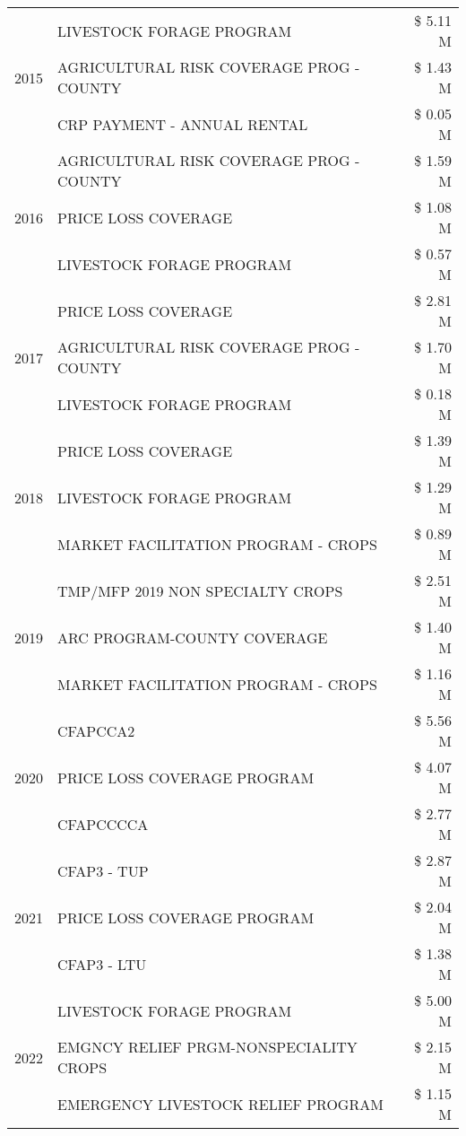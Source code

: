 \begin{tabular}{llr}
\multirow[t]{3}{*}{2015} & LIVESTOCK FORAGE PROGRAM & \$ 5.11 M \\
 & AGRICULTURAL RISK COVERAGE PROG - COUNTY & \$ 1.43 M \\
 & CRP PAYMENT - ANNUAL RENTAL & \$ 0.05 M \\
\cline{1-3}
\multirow[t]{3}{*}{2016} & AGRICULTURAL RISK COVERAGE PROG - COUNTY & \$ 1.59 M \\
 & PRICE LOSS COVERAGE & \$ 1.08 M \\
 & LIVESTOCK FORAGE PROGRAM & \$ 0.57 M \\
\cline{1-3}
\multirow[t]{3}{*}{2017} & PRICE LOSS COVERAGE & \$ 2.81 M \\
 & AGRICULTURAL RISK COVERAGE PROG - COUNTY & \$ 1.70 M \\
 & LIVESTOCK FORAGE PROGRAM & \$ 0.18 M \\
\cline{1-3}
\multirow[t]{3}{*}{2018} & PRICE LOSS COVERAGE & \$ 1.39 M \\
 & LIVESTOCK FORAGE PROGRAM & \$ 1.29 M \\
 & MARKET FACILITATION PROGRAM - CROPS & \$ 0.89 M \\
\cline{1-3}
\multirow[t]{3}{*}{2019} & TMP/MFP 2019 NON SPECIALTY CROPS & \$ 2.51 M \\
 & ARC PROGRAM-COUNTY COVERAGE & \$ 1.40 M \\
 & MARKET FACILITATION PROGRAM - CROPS & \$ 1.16 M \\
\cline{1-3}
\multirow[t]{3}{*}{2020} & CFAPCCA2 & \$ 5.56 M \\
 & PRICE LOSS COVERAGE PROGRAM & \$ 4.07 M \\
 & CFAPCCCCA & \$ 2.77 M \\
\cline{1-3}
\multirow[t]{3}{*}{2021} & CFAP3 - TUP & \$ 2.87 M \\
 & PRICE LOSS COVERAGE PROGRAM & \$ 2.04 M \\
 & CFAP3 - LTU & \$ 1.38 M \\
\cline{1-3}
\multirow[t]{3}{*}{2022} & LIVESTOCK FORAGE PROGRAM & \$ 5.00 M \\
 & EMGNCY RELIEF PRGM-NONSPECIALITY CROPS & \$ 2.15 M \\
 & EMERGENCY LIVESTOCK RELIEF PROGRAM & \$ 1.15 M \\
\cline{1-3}
\bottomrule
\end{tabular}
